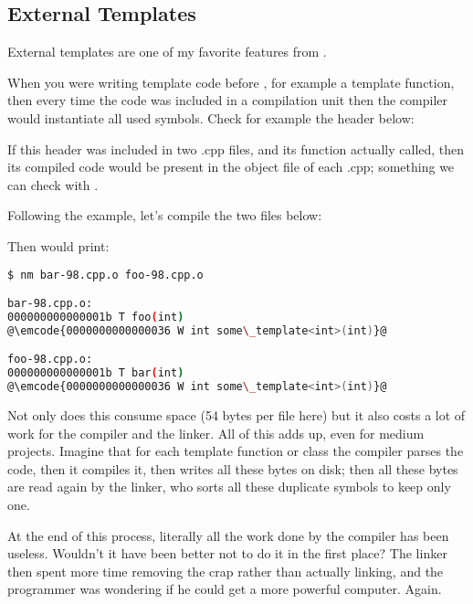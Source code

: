 \subsection{External Templates}

External templates are one of my favorite features from .

When you were writing template code before , for example a
template function, then every time the code was included in a
compilation unit then the compiler would instantiate all used
symbols. Check for example the header below:



If this header was included in two .cpp files, and its function
actually called, then its compiled code would be present in the object
file of each .cpp; something we can check with .

Following the example, let's compile the two files below:





Then  would print:

\begin{lstlisting}[language=bash]
$ nm bar-98.cpp.o foo-98.cpp.o

bar-98.cpp.o:
000000000000001b T foo(int)
@\emcode{0000000000000036 W int some\_template<int>(int)}@

foo-98.cpp.o:
000000000000001b T bar(int)
@\emcode{0000000000000036 W int some\_template<int>(int)}@
\end{lstlisting}

Not only does this consume space (54 bytes per file here) but it also
costs a lot of work for the compiler and the linker. All of this adds
up, even for medium projects. Imagine that for each template function
or class the compiler parses the code, then it compiles it, then
writes all these bytes on disk; then all these bytes are read again by
the linker, who sorts all these duplicate symbols to keep only one.

At the end of this process, literally all the work done by the
compiler has been useless. Wouldn't it have been better not to do it
in the first place? The linker then spent more time removing the crap
rather than actually linking, and the programmer was wondering if he
could get a more powerful computer. Again.

